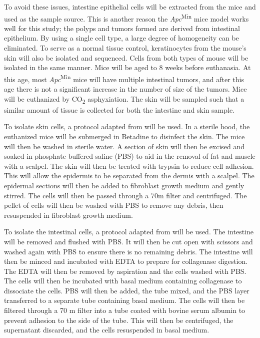 To avoid these issues, intestine epithelial cells will be extracted from the mice and used as the sample source. This is another reason the \textit{Apc}\textsuperscript{Min} mice model works well for this study; the polyps and tumors formed are derived from intestinal epithelium. By using a single cell type, a large degree of homogeneity can be eliminated. To serve as a normal tissue control, keratinocytes from the mouse's skin will also be isolated and sequenced. Cells from both types of mouse will be isolated in the same manner. Mice will be aged to 8 weeks before euthanasia. At this age, most \textit{Apc}\textsuperscript{Min} mice will have multiple intestinal tumors, and after this age there is not a significant increase in the number of size of the tumors. Mice will be euthanized by CO\textsubscript{2} asphyxiation. The skin will be sampled such that a similar amount of tissue is collected for both the intestine and skin sample.

To isolate skin cells, a protocol adapted from \cite{jensen_isolation_2013} will be used.
In a sterile hood, the euthanized mice will be submerged in Betadine to disinfect the skin. The mice will then be washed in sterile water. A section of skin will then be excised and soaked in phosphate buffered saline (PBS) to aid in the removal of fat and muscle with a scalpel. The skin will then be treated with trypsin to reduce cell adhesion. This will allow the epidermis to be separated from the dermis with a scalpel. The epidermal sections will then be 
added to fibroblast growth medium and gently stirred. The cells will then be passed through a 70\mu m filter and centrifuged. The pellet of cells will then be washed with PBS to remove any debris, then resuspended in fibroblast growth medium.

To isolate the intestinal cells, a protocol adapted from \cite{orourke_isolation_2016} will be used.
The intestine will be removed and flushed with PBS. It will then be cut open with scissors and washed again with PBS to ensure there is no remaining debris. The intestine will then be minced and incubated with EDTA to prepare for collagenase digestion. The EDTA will then be removed by aspiration and the cells washed with PBS. The cells will then be incubated with basal medium containing collagenase to dissociate the cells. PBS will then be added, the tube mixed, and the PBS layer transferred to a separate tube containing basal medium. The cells will then be filtered through a 70 \mu m filter into a tube coated with bovine serum albumin to prevent adhesion to the side of the tube. This will then be centrifuged, the supernatant discarded, and the cells resuspended in basal medium.


